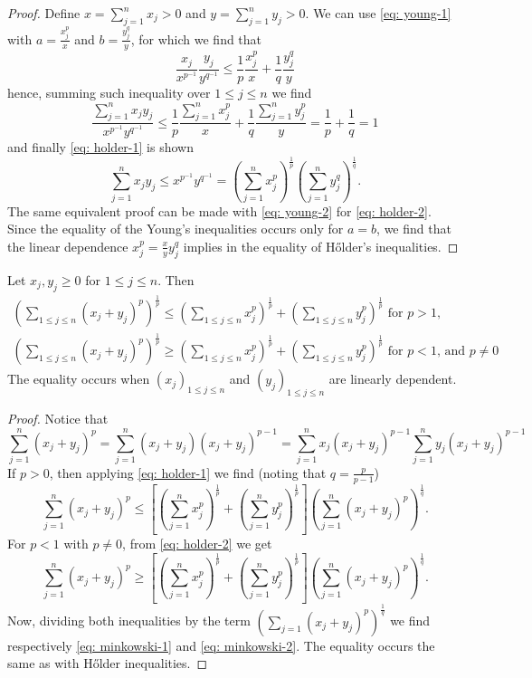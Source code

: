 \begin{proof}
Define \(x = \sum_{j=1}^n x_j > 0\) and \(y = \sum_{j=1}^n y_j > 0\). We can
use \cref{eq: young-1} with \(a = \frac {x_j^p} x\) and \(b = \frac {y_j^q}
y\), for which we find that
\[
\frac{x_j}{x^{p^{-1}}} \frac{y_j}{y^{q^{-1}}} \leq \frac 1 p \frac{x_j^p} x
+ \frac 1 q \frac{y_j^q} y
\]
hence, summing such inequality over \(1 \leq j \leq n\) we find
\[
\frac{\sum_{j=1}^n x_j y_j}{x^{p^{-1}} y^{q^{-1}}} \leq \frac 1 p
\frac{\sum_{j=1}^n x_j^p} x + \frac 1 q \frac{\sum_{j=1}^n y_j^p} y = \frac
1 p + \frac 1 q = 1
\]
and finally \cref{eq: holder-1} is shown
\[
\sum_{j=1}^n x_j y_j \leq x^{p^{-1}} y^{q^{-1}}
= \left(\sum_{j=1}^n x_j^p\right)^{\frac 1 p}
\left(\sum_{j=1}^n y_j^q\right)^{\frac 1 q}.
\]
The same equivalent proof can be made with \cref{eq: young-2} for \cref{eq:
holder-2}. Since the equality of the Young's inequalities occurs only for \(a
= b\), we find that the linear dependence \(x_j^p = \frac x y y_j^q\) implies
in the equality of H\H{o}lder's inequalities.
\end{proof}

\begin{proposition}\label{prop: minkowski-ineq}
Let \(x_j, y_j \geq 0\) for \(1 \leq j \leq n\). Then
\begin{gather}
\label{eq: minkowski-1}
\left(\sum_{1 \leq j \leq n} (x_j + y_j)^p \right)^{\frac 1 p}
\leq \left(\sum_{1 \leq j \leq n} x_j^p \right)^{\frac 1 p}
+ \left(\sum_{1 \leq j \leq n} y_j^p\right)^{\frac 1 p}
\text{ for } p > 1,
\\ \label{eq: minkowski-2}
\left(\sum_{1 \leq j \leq n} (x_j + y_j)^p \right)^{\frac 1 p}
\geq \left(\sum_{1 \leq j \leq n} x_j^p \right)^{\frac 1 p}
+ \left(\sum_{1 \leq j \leq n} y_j^p\right)^{\frac 1 p}
\text{ for } p < 1 \text{, and } p \neq 0
\end{gather}
The equality occurs when \((x_j)_{1 \leq j \leq n}\) and \((y_j)_{1 \leq j
\leq n}\) are linearly dependent.
\end{proposition}

\begin{proof}
Notice that
\[
\sum_{j=1}^n (x_j + y_j)^p = \sum_{j=1}^n (x_j + y_j)(x_j + y_j)^{p-1}
= \sum_{j=1}^n x_j (x_j + y_j)^{p-1} \sum_{j=1}^n y_j (x_j + y_j)^{p-1}
\]
If \(p > 0\), then applying \cref{eq: holder-1} we find (noting that \(q =
\frac p {p - 1}\))
\[
\sum_{j=1}^n (x_j + y_j)^p \leq \left[
    \left(\sum_{j=1}^n x_j^p\right)^{\frac 1 p}
    + \left(\sum_{j=1}^n y_j^p\right)^{\frac 1 p}
\right] \left(\sum_{j=1}^n (x_j + y_j)^p\right)^{\frac 1 q}.
\]
For \(p < 1\) with \(p \neq 0\), from \cref{eq: holder-2} we get
\[
\sum_{j=1}^n (x_j + y_j)^p \geq \left[
    \left(\sum_{j=1}^n x_j^p\right)^{\frac 1 p}
    + \left(\sum_{j=1}^n y_j^p\right)^{\frac 1 p}
\right] \left(\sum_{j=1}^n (x_j + y_j)^p\right)^{\frac 1 q}.
\]
Now, dividing both inequalities by the term \(\left(\sum_{j=1} (x_j + y_j)^p
\right)^{\frac 1 q}\) we find respectively \cref{eq: minkowski-1} and
\cref{eq: minkowski-2}. The equality occurs the same as with H\H{o}lder
inequalities.
\end{proof}

